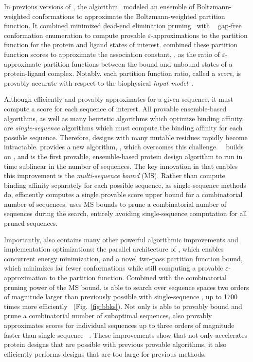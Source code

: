 \def\multisequencebound{MS\xspace}
\def\msbound{\multisequencebound}


\newcommand{\cut}[1]{}

In previous versions of \osprey, the \ks algorithm~\cite{K*} modeled an ensemble of Boltzmann-weighted conformations to approximate the Boltzmann-weighted partition function. It combined minimized dead-end elimination pruning~\cite{DEE} with \as~\cite{DEE,A*} gap-free conformation enumeration to compute provable $\varepsilon$-approximations to the partition function for the protein and ligand states of interest. \ks combined these partition function scores to approximate the association constant, \ka, as the ratio of $\varepsilon$-approximate partition functions between the bound and unbound states of a protein-ligand complex. Notably, each partition function ratio, called a \ks \emph{score}, is provably accurate with respect to the biophysical \emph{input model}~\cite{K*,minDEE,iMinDEE}. 

Although \ks efficiently and provably approximates \ka for a given sequence, it must compute a \ks score for each sequence of interest. All provable ensemble-based algorithms, as well as many heuristic algorithms which optimize binding affinity, are \emph{single-sequence} algorithms which must compute the binding affinity for each possible sequence. Therefore, designs with many mutable residues rapidly become intractable.  provides a new algorithm, \bbks, which overcomes this challenge. \bbks~\cite{BBK*} builds on \ks, and is the first provable, ensemble-based protein design algorithm to run in time sublinear in the number of sequences. The key innovation in \bbks that enables this improvement is the \emph{multi-sequence bound} (\msbound). Rather than compute binding affinity separately for each possible sequence, as single-sequence methods do, \bbks efficiently computes a single provable \ks score upper bound for a combinatorial number of sequences. \bbks uses \msbound bounds to prune a combinatorial number of sequences during the search, entirely avoiding single-sequence computation for all pruned sequences.

Importantly, \bbks also contains many other powerful algorithmic improvements and implementation optimizations: the parallel architecture of \bbks, which enables concurrent energy minimization, and a novel two-pass partition function bound, which minimizes far fewer conformations while still computing a provable $\varepsilon$-approximation to the partition function. Combined with the combinatorial pruning power of the \msbound bound, \bbks is able to search over sequence spaces two orders of magnitude larger than previously possible with single-sequence \ks, up to 1700 times more efficiently~\cite{BBK*} (Fig.~\ref{fig:bbks}). Not only is \bbks able to provably bound and prune a combinatorial number of suboptimal sequences, \bbks also provably approximates \ks scores for individual sequences up to three orders of magnitude faster than single-sequence \ks~\cite{BBK*}. These improvements show that \bbks not only accelerates protein designs that are possible with previous provable algorithms, it also efficiently performs designs that are too large for previous methods.

